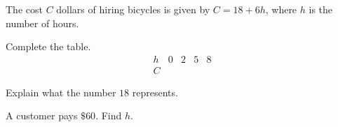  The cost $C$ dollars of hiring bicycles is given by $C=18+6h$, where $h$ is the number of hours.
\begin{subparts}
  \item Complete the table.
  \[
  \begin{array}{c|cccc}
  h&0&2&5&8\\ \hline
  C&&&&
  \end{array}
  \]
  \item Explain what the number $18$ represents.
  \item A customer pays $\$60$. Find $h$.
\end{subparts}
